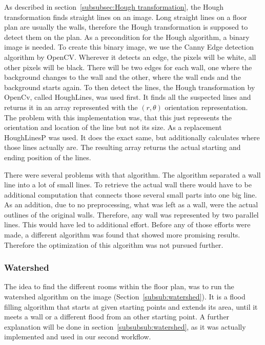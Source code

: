 As described in section~\ref{subsubsec:Hough transformation}, the Hough transformation finds straight lines on an image. Long straight lines on a floor plan are usually the walls, therefore the Hough transformation is supposed to detect them on the plan. As a precondition for the Hough algorithm, a binary image is needed. To create this binary image, we use the Canny Edge detection algorithm by OpenCV. Wherever it detects an edge, the pixels will be white, all other pixels will be black. There will be two edges for each wall, one where the background changes to the wall and the other, where the wall ends and the background starts again. To then detect the lines, the Hough transformation by OpenCv, called HoughLines, was used first. It finds all the suspected lines and returns it in an array represented with the $(r,\theta)$ orientation representation. The problem with this implementation was, that this just represents the orientation and location of the line but not its size.
As a replacement HoughLinesP was used. It does the exact same, but additionally calculates where those lines actually are. The resulting array returns the actual starting and ending position of the lines. 

There were several problems with that algorithm. The algorithm separated a wall line into a lot of small lines. To retrieve the actual wall there would have to be additional computation that connects those several small parts into one big line. As an addition, due to no preprocessing, what was left as a wall, were the actual outlines of the original walls. Therefore, any wall was represented by two parallel lines. This would have led to additional effort. Before any of those efforts were made, a different algorithm was found that showed more promising results. Therefore the optimization of this algorithm was not pursued further.

  
\subsubsection{Watershed}
The idea to find the different rooms within the floor plan, was to run the watershed algorithm on the image (Section~\ref{subsub:watershed}). It is a flood filling algorithm that starts at given starting points and extends its area, until it meets a wall or a different flood from an other starting point. A further explanation will be done in section~\ref{subsubsub:watershed}, as it was actually implemented and used in our second workflow.

\pagebreak

